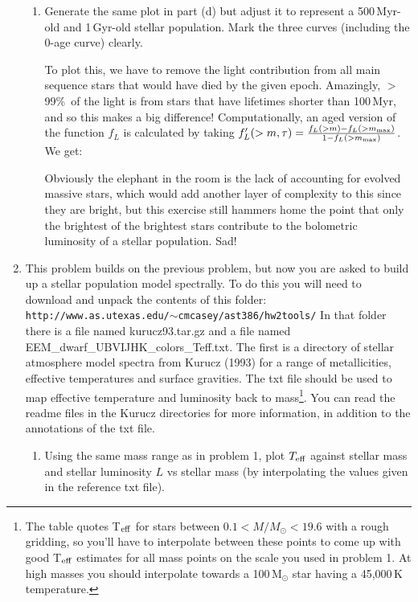 \documentclass[11pt]{article}
\begin{document}
\begin{enumerate}
\begin{enumerate}
    \item Generate the same plot in part (d) but adjust it to
      represent a 500\,Myr-old and 1\,Gyr-old stellar population.
      Mark the three curves (including the 0-age curve) clearly.

{\color{gray} To plot this, we have to remove the light contribution
  from all main sequence stars that would have died by the given
  epoch.  Amazingly, $>$99\%\ of the light is from stars that have
  lifetimes shorter than 100\,Myr, and so this makes a big difference!
  Computationally, an aged version of the function $f_{L}$ is
  calculated by taking
  $f^\prime_{L}(>m,\tau)=\frac{f_{L}(>m)-f_L(>m_{\rm
      max})}{1-f_L(>m_{\rm max})}$.  We get:

\begin{figure}[h!]
\centering
\end{figure}


  Obviously the elephant in the room is the lack of accounting for
  evolved massive stars, which would add another layer of complexity
  to this since they are bright, but this exercise still hammers home
  the point that only the brightest of the brightest stars contribute
  to the bolometric luminosity of a stellar population. Sad!}
\end{enumerate}
  \item This problem builds on the previous problem, but now you are
    asked to build up a stellar population model spectrally.  To do
    this you will need to download and unpack the contents of this
    folder:
    {\tt http://www.as.utexas.edu/$\sim$cmcasey/ast386/hw2tools/}
    In that folder there is a file named kurucz93.tar.gz and a file
    named EEM\_dwarf\_UBVIJHK\_colors\_Teff.txt.  The first is a
    directory of stellar atmosphere model spectra from Kurucz (1993)
    for a range of metallicities, effective temperatures and surface
    gravities.  The txt file should be used to map effective
    temperature and luminosity back to mass\footnote{The table quotes
      T$_{\rm eff}$ for stars between $0.1<M/M_\odot<19.6$ with a
      rough gridding, so you'll have to interpolate between these
      points to come up with good T$_{\rm eff}$ estimates for all mass
      points on the scale you used in problem 1.  At high masses you
      should interpolate towards a 100\,M$_\odot$ star having a
      45,000\,K temperature.}.  You can read the readme files in the
    Kurucz directories for more information, in addition to the
    annotations of the txt file.
  \begin{enumerate}
  \item Using the same mass range as in problem 1, plot $T_{\rm
    eff}$ against stellar mass and stellar luminosity $L$ vs stellar
    mass (by interpolating the values given in the reference txt
    file).


\end{enumerate}
\end{enumerate}
\end{document}
